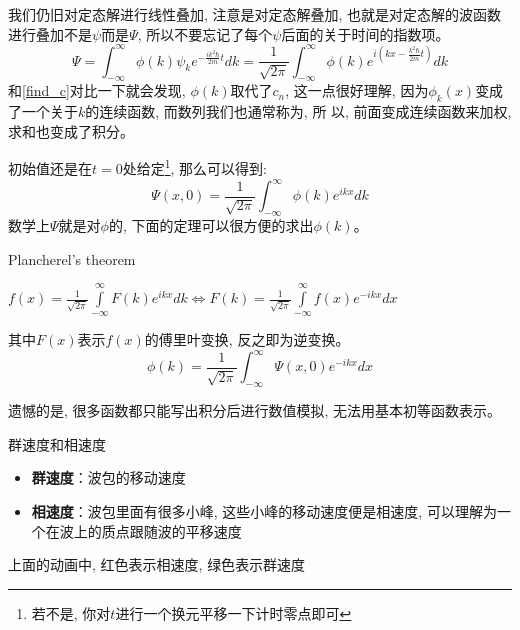 \documentclass[a4paper,zihao=-4,linespread=1]{ctexrep}
\newenvironment{lequation}{\large\begin{equation}}{\end{equation}}
\begin{document}
    我们仍旧对定态解进行线性叠加, 注意是对定态解叠加, 也就是对定态解的波函数进行叠加不是$\psi$而是$\Psi$, 所以不要忘记了每个$\psi$后面的关于时间的指数项。
    \begin{lequation}
        \label{2.26}
        \boxed{
            \Psi=\int_{-\infty}^{\infty}\phi(k)\psi_ke^{-\frac{ik^2\hbar}{2m}t}dk=\frac{1}{\sqrt{2\pi}}\int_{-\infty}^{\infty}\phi(k)e^{i\left(kx-\frac{k^2\hbar}{2m}t\right)}dk  
        }
    \end{lequation}
    和\ref{find_c}对比一下就会发现, $\phi(k)$取代了$c_n$, 这一点很好理解, 因为$\phi_k(x)$变成了一个关于$k$的连续函数, 而数列我们也通常称为, 所
    以, 前面变成连续函数来加权, 求和也变成了积分。

    初始值还是在$t=0$处给定\footnote{若不是, 你对$t$进行一个换元平移一下计时零点即可}, 那么可以得到:
    \begin{lequation}
        \Psi(x,0)=\frac{1}{\sqrt{2\pi}}\int_{-\infty}^{\infty}\phi(k)e^{ikx}dk  
    \end{lequation}
    数学上$\Psi$就是对$\phi$的, 下面的定理可以很方便的求出$\phi(k)$。
    \begin{theorem}{Plancherel's theorem}
        \begin{center}
            \begin{math}
                \displaystyle
                f(x)=\frac{1}{\sqrt{2\pi}} \int\limits_{-\infty}^{\infty}F(k)e^{ikx}dk\Longleftrightarrow F(k)=\frac{1}{\sqrt{2\pi}} \int\limits_{-\infty}^{\infty}f(x)e^{-ikx}dx
            \end{math}
        \end{center}
    \end{theorem}

    其中$F(x)$表示$f(x)$的傅里叶变换, 反之即为逆变换。
    \begin{lequation}
        \boxed{
            \phi(k)=\frac{1}{\sqrt{2\pi}} \int _{-\infty}^{\infty}\Psi(x,0)e^{-ikx}dx
        }
    \end{lequation}
    
    遗憾的是, 很多函数都只能写出积分后进行数值模拟, 无法用基本初等函数表示。
    \begin{define}{群速度和相速度}
        \begin{itemize}
            \item \textbf{群速度}：波包的移动速度
            \item \textbf{相速度}：波包里面有很多小峰, 这些小峰的移动速度便是相速度, 可以理解为一个在波上的质点跟随波的平移速度
        \end{itemize}
    \end{define}
    \begin{center}
        上面的动画中, {\color{red}红色}表示相速度, {\color{green}绿色}表示群速度
    \end{center}
    
\end{document}
